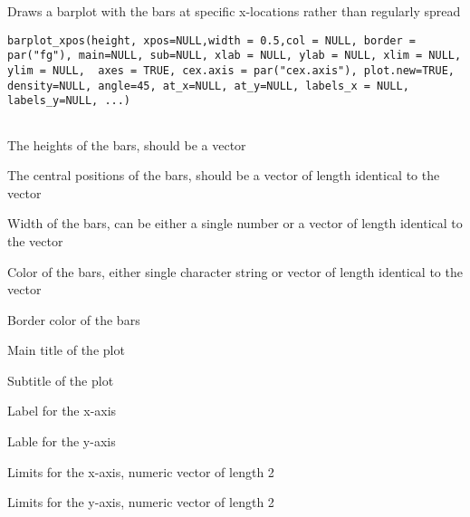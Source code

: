 \documentclass[a4paper]{book}
\begin{document}
%
\begin{Description}\relax
Draws a barplot with the bars at specific x-locations rather than regularly spread
\end{Description}
%
\begin{Usage}
\begin{verbatim}
barplot_xpos(height, xpos=NULL,width = 0.5,col = NULL, border = par("fg"), main=NULL, sub=NULL, xlab = NULL, ylab = NULL, xlim = NULL, ylim = NULL,  axes = TRUE, cex.axis = par("cex.axis"), plot.new=TRUE,   density=NULL, angle=45, at_x=NULL, at_y=NULL, labels_x = NULL, labels_y=NULL, ...)
                            
\end{verbatim}
\end{Usage}
%
\begin{Arguments}
\begin{ldescription}
\item[\code{height}] 
The heights of the bars, should be a vector

\item[\code{xpos}] 
The central positions of the bars, should be a vector of length identical to the  vector

\item[\code{width}] 
Width of the bars, can be either a single number or a vector of length identical to the  vector  

\item[\code{col}] 
Color of the bars, either single character string or vector of length identical to the  vector

\item[\code{border}] 
Border color of the bars

\item[\code{main}] 
Main title of the plot

\item[\code{sub}] 
Subtitle of the plot

\item[\code{xlab}] 
Label for the x-axis

\item[\code{ylab}] 
Lable for the y-axis

\item[\code{xlim}] 
Limits for the x-axis, numeric vector of length 2

\item[\code{ylim}] 
Limits for the y-axis, numeric vector of length 2


\end{ldescription}
\end{Arguments}
\end{document}
